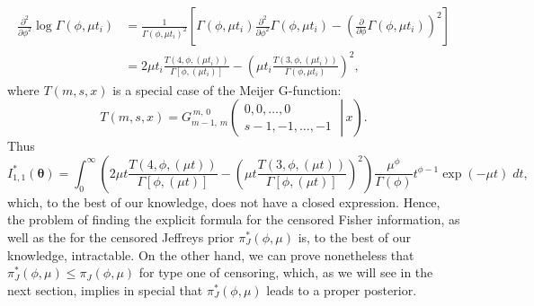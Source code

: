 \documentclass[12pt]{article} %
\theoremstyle{plain}%
\theoremstyle{definition}
\theoremstyle{remark}
\begin{document}
    \begin{equation*}
    \begin{aligned}
    \frac{\partial^2}{\partial \phi ^2} \log \Gamma(\phi,\mu t_i) &= \frac{1}{\Gamma(\phi,\mu t_i)^2}\left[\Gamma(\phi,\mu t_i)\frac{\partial^2}{\partial \phi ^2}\Gamma(\phi,\mu t_i) - \left(\frac{\partial}{\partial \phi}\Gamma(\phi,\mu t_i)\right)^2\right]\\
    &=2\mu t_i \frac{T(4,\phi,(\mu t_i))}{\Gamma\left[\phi,(\mu t_i)\right]}-\left(\mu t_i\frac{T(3,\phi,(\mu t_i))}{\Gamma(\phi,\mu t_i)}\right)^2,
    \end{aligned}
\end{equation*}
where $T(m,s,x)$ is a special case of the Meijer G-function:
\begin{equation*} 
T(m,s,x) = G_{m-1,\,m}^{\,m,\,0}\!\left(\left.{\begin{matrix}0,0,\dots ,0\\s-1,-1,\dots ,-1\end{matrix}}\;\right|\,x\right).
\end{equation*}
Thus
\begin{equation*} I_{1,1}^*(\boldsymbol{\theta}) = \int_0^\infty \left(2\mu t \frac{T(4,\phi,(\mu t))}{\Gamma\left[\phi,(\mu t)\right]}-\left(\mu t\frac{T(3,\phi,(\mu t))}{\Gamma[\phi,(\mu t)]}\right)^2\right)\frac{\mu^\phi}{\Gamma(\phi)}t^{\phi-1}\exp(-\mu t)\; dt,
\end{equation*}
which, to the best of our knowledge,  does not have a closed expression. Hence, the problem of finding the explicit formula for the censored Fisher information, as well as the for the censored Jeffreys prior $\pi_J^*\left(\phi,\mu\right)$ is, to the best of our knowledge, intractable. On the other hand, we can prove nonetheless that $\pi_J^*\left(\phi,\mu\right)\leq \pi_J(\phi,\mu)$ for type one of censoring, which, as we will see in the next section, implies in special that $\pi_J^*(\phi,\mu)$ leads to a proper posterior.
\end{document}
